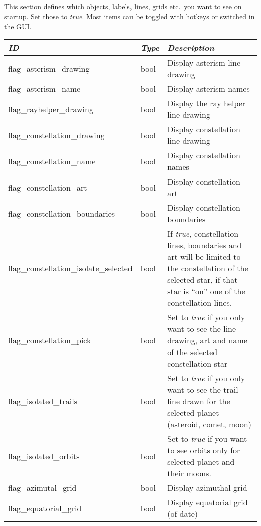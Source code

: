 \subsection{}

This section defines which objects, labels, lines, grids etc.\ you
want to see on startup. Set those to \emph{true}. Most items can be
toggled with hotkeys or switched in the GUI.

\begin{longtable}{l|l|p{77mm}}
\toprule
\emph{ID} & \emph{Type} & \emph{Description}\\\midrule
flag\_asterism\_drawing         & bool  & Display asterism line drawing\\%
flag\_asterism\_name            & bool  & Display asterism names\\%
flag\_rayhelper\_drawing        & bool  & Display the ray helper line drawing\\%
flag\_constellation\_drawing    & bool  & Display constellation line drawing\\%
flag\_constellation\_name       & bool  & Display constellation names\\%
flag\_constellation\_art        & bool  & Display constellation art\\%
flag\_constellation\_boundaries & bool  & Display constellation boundaries \\%
flag\_constellation\_isolate\_selected  & bool & If \emph{true}, constellation lines, boundaries and art will be limited to the constellation of the selected star, 
                                                 if that star is ``on'' one of the constellation lines.\\%
flag\_constellation\_pick     & bool & Set to \emph{true} if you only want to see the line drawing, art and name of the selected constellation star\\\midrule
%
flag\_isolated\_trails        & bool & Set to \emph{true} if you only want to see the trail line drawn for the selected planet (asteroid, comet, moon)\\%
flag\_isolated\_orbits        & bool & Set to \emph{true} if you want to see orbits only for selected planet and their moons.\\%
flag\_azimutal\_grid          & bool & Display azimuthal grid \\%
flag\_equatorial\_grid        & bool & Display equatorial grid (of date) \\%

\end{longtable}
